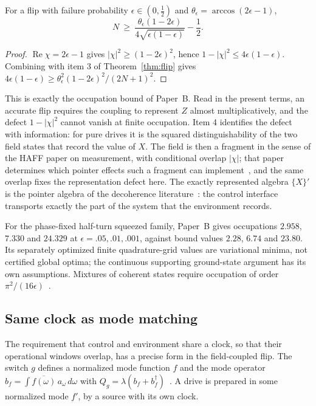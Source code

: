 \begin{corollary}
\label{cor:energy}
For a flip with failure probability $\epsilon\in(0,\tfrac12)$ and $\theta_\epsilon=\arccos(2\epsilon-1)$,
\begin{equation}
N\ \ge\ \frac{\theta_\epsilon(1-2\epsilon)}{4\sqrt{\epsilon(1-\epsilon)}}-\frac12 .
\end{equation}
\end{corollary}

\begin{proof}
$\operatorname{Re}\chi=2\epsilon-1$ gives $|\chi|^2\ge(1-2\epsilon)^2$, hence $1-|\chi|^2\le4\epsilon(1-\epsilon)$. Combining with item 3 of Theorem~\ref{thm:flip} gives $4\epsilon(1-\epsilon)\ge\theta_\epsilon^2(1-2\epsilon)^2/(2N+1)^2$.
\end{proof}

This is exactly the occupation bound of Paper~B. Read in the present terms, an accurate flip requires the coupling to represent $Z$ almost multiplicatively, and the defect $1-|\chi|^2$ cannot vanish at finite occupation. Item 4 identifies the defect with information: for pure drives it is the squared distinguishability of the two field states that record the value of $X$. The field is then a fragment in the sense of the HAFF paper on measurement, with conditional overlap $|\chi|$; that paper determines which pointer effects such a fragment can implement~\cite{Liu2026PaperE}, and the same overlap fixes the representation defect here. The exactly represented algebra $\{X\}'$ is the pointer algebra of the decoherence literature~\cite{Zurek2003}: the control interface transports exactly the part of the system that the environment records.

For the phase-fixed half-turn squeezed family, Paper~B gives occupations
$2.958$, $7.330$ and $24.329$ at $\epsilon=.05,.01,.001$,
against bound values $2.28$, $6.74$ and $23.80$.
Its separately optimized finite quadrature-grid values are variational
minima, not certified global optima; the continuous supporting
ground-state argument has its own assumptions.
Mixtures of coherent states require occupation of order
$\pi^2/(16\epsilon)$~\cite{Liu2026QRAIF_B}.

\subsection{Same clock as mode matching}
\label{sec:clock}

The requirement that control and environment share a clock, so that their operational windows overlap, has a precise form in the field-coupled flip. The switch $g$ defines a normalized mode function $f$ and the mode operator $b_f=\int\overline{f(\omega)}\,a_\omega\,d\omega$ with $Q_g=\lambda(b_f+b_f^\dagger)$~\cite{Liu2026QRAIF_B}. A drive is prepared in some normalized mode $f'$, by a source with its own clock.

